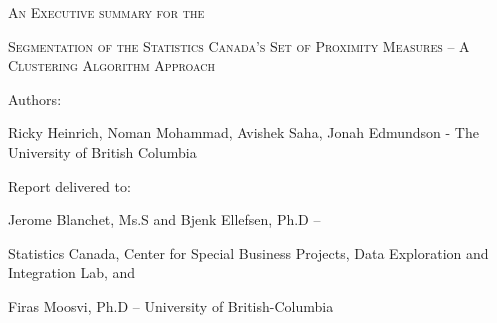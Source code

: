 \documentclass[11pt, a4paper]{article}
\begin{document}
\setlength{\parindent}{0pt}

\textsc{An Executive summary for the} \par
\Large{\textsc{Segmentation of the Statistics Canada's Set of Proximity Measures – A
Clustering Algorithm Approach}}
\par
\vspace{0.917 pc} %
\par
\normalsize{ }

\thispagestyle{firststyle}


\begin{footnotesize}
Authors: \par
Ricky Heinrich, Noman Mohammad, Avishek Saha, Jonah Edmundson - The University of British Columbia
\end{footnotesize}
\par
\vspace{1pc}
\par
\begin{footnotesize}
Report delivered to: \par
Jerome Blanchet, Ms.S and Bjenk Ellefsen, Ph.D – \par
Statistics Canada, Center for Special Business Projects, Data Exploration and Integration Lab, and \par
Firas Moosvi, Ph.D – University of British-Columbia
\end{footnotesize}

\vspace{2pc}
\end{document}
